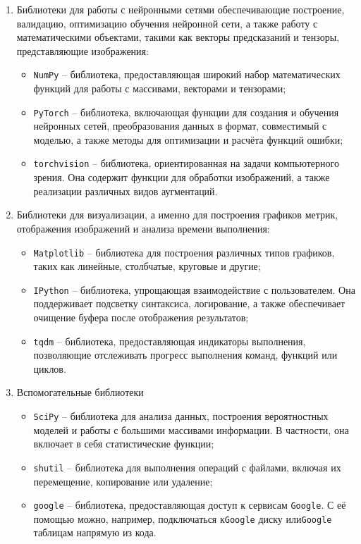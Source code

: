 \documentclass[14pt, russian]{scrartcl}
\begin{document}
\begin{enumerate} 
    \item Библиотеки для работы с нейронными сетями обеспечивающие построение, валидацию, оптимизацию обучения нейронной сети, а также работу с математическими объектами, такими как векторы предсказаний и тензоры, представляющие изображения:                
        \begin{itemize} 
            \item \verb|NumPy|\cite{numpy} -- библиотека, предоставляющая широкий набор математических функций для работы с массивами, векторами и тензорами;
            \item \verb|PyTorch|\cite{pytorch} -- библиотека, включающая функции для создания и обучения нейронных сетей, преобразования данных в формат, совместимый с моделью, а также методы для оптимизации и расчёта функций ошибки;
            \item \verb|torchvision|\cite{torchvision} -- библиотека, ориентированная на задачи компьютерного зрения. Она содержит функции для обработки изображений, а также реализации различных видов аугментаций.
        \end{itemize}
    \item Библиотеки для визуализации, а именно для построения графиков метрик, отображения изображений и анализа времени выполнения: 
        \begin{itemize} 
            \item \verb|Matplotlib|\cite{matplot} -- библиотека для построения различных типов графиков, таких как линейные, столбчатые, круговые и другие;
            \item \verb|IPython|\cite{ipython} -- библиотека, упрощающая взаимодействие с пользователем. Она поддерживает подсветку синтаксиса, логирование, а также обеспечивает очищение буфера после отображения результатов;
            \item \verb|tqdm|\cite{tqdm} -- библиотека, предоставляющая индикаторы выполнения, позволяющие отслеживать прогресс выполнения команд, функций или циклов.
        \end{itemize}
    \item Вспомогательные библиотеки
        \begin{itemize} 
            \item \verb|SciPy|\cite{scipy} -- библиотека для анализа данных, построения вероятностных моделей и работы с большими массивами информации. В частности, она включает в себя статистические функции;
            \item \verb|shutil|\cite{shutil} -- библиотека для выполнения операций с файлами, включая их перемещение, копирование или удаление;
            \item \verb|google|\cite{google} -- библиотека, предоставляющая доступ к сервисам \verb|Google|. С её помощью можно, например, подключаться к\verb|Google| диску или\verb|Google| таблицам напрямую из кода.
        \end{itemize}
\end{enumerate}
\end{document}
